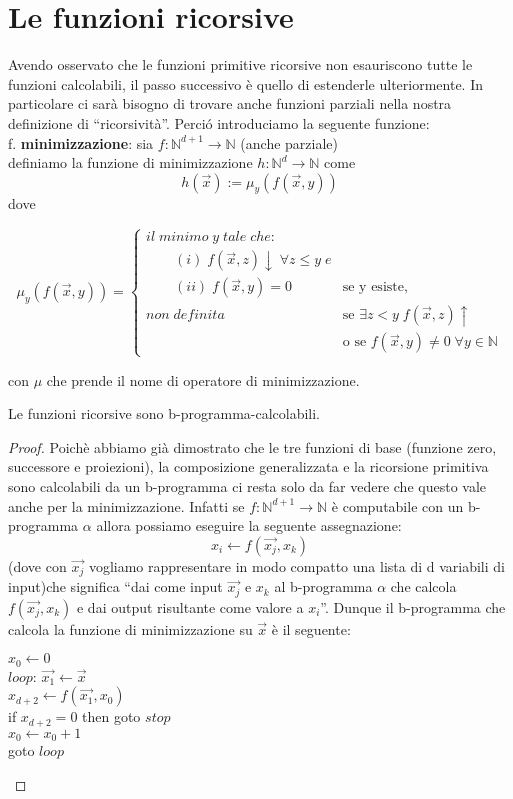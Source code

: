 \section{Le funzioni ricorsive}
Avendo osservato che le funzioni primitive ricorsive non
esauriscono tutte le funzioni calcolabili, il passo successivo \`e  quello di
estenderle ulteriormente. In particolare ci sar\`a bisogno di trovare
anche funzioni parziali nella nostra definizione di ``ricorsivit\`a''. Perci\'o
introduciamo
la seguente funzione: \\

f. \textbf{minimizzazione}: sia $f: \mathbb{N}^{d+1} \to \mathbb{N}$ (anche
parziale)\\
definiamo la funzione di minimizzazione $h: \mathbb{N}^{d} \to \mathbb{N}$ come
$$ h(\vec{x}):= \mu_{y}(f(\vec{x},y)) $$
dove

\[\mu_{y}(f(\vec{x},y)) = 
\begin{cases}
il \; minimo \; y \; tale \; che: \\
\qquad (i) \; f(\vec{x},z)\downarrow \; \forall z \leq y \; e \\
\qquad (ii) \; f(\vec{x},y)=0 & \text{se y esiste,} \\
non \; definita \; & \text{se $\exists z < y \; f(\vec{x},z) \uparrow$}\\
 & \text{o se $f(\vec{x},y)\neq 0 \; \forall y \in \mathbb{N} $}
\end{cases} \]

con $\mu$ che prende il nome di operatore di minimizzazione.
\begin{teorema} Le funzioni ricorsive sono b-programma-calcolabili.
\end{teorema}
\begin{proof} Poich\`e abbiamo gi\`a dimostrato che le tre funzioni di base
(funzione zero, successore e proiezioni), la composizione generalizzata e la
ricorsione primitiva sono calcolabili da un b-programma ci resta solo da far
vedere che questo vale anche per la minimizzazione. Infatti se
$f:\mathbb{N}^{d+1} \to \mathbb{N}$ \`e computabile con un b-programma $\alpha$
allora possiamo eseguire la seguente assegnazione:
$$x_i \leftarrow f(\vec{x_{j}}, x_k)$$
(dove con $\vec{x_{j}}$ vogliamo rappresentare in modo compatto una lista di d
variabili di input)che significa "`dai come input $\vec{x_{j}}$ e $x_k$ al
b-programma $\alpha$ che calcola $f(\vec{x_{j}}, x_k)$ e dai output risultante
come valore a $x_i$"'. Dunque il b-programma che calcola la funzione di
minimizzazione su $\vec{x}$ \`e il seguente:\\
   \begin{mylisting}
       $x_0 \leftarrow 0$ \\
       $loop$: $\vec{x_{1}} \leftarrow \vec{x}$\\
       $x_{d+2} \leftarrow f(\vec{x_{1}}, x_0)$\\
       if $x_{d+2} = 0$ then goto $stop$\\
       $x_0 \leftarrow x_0 + 1$\\
       goto $loop$
  \end{mylisting}
\end{proof}

